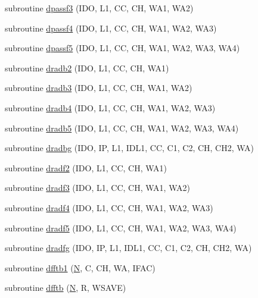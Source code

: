 \begin{DoxyCompactItemize}
\item 
subroutine \hyperlink{dfft_8f_a8eb4ff1245af8c665bfe4f79a98b48f4}{dpassf3} (I\+D\+O, L1, C\+C, C\+H, W\+A1, W\+A2)
\item 
subroutine \hyperlink{dfft_8f_a4e4b63d576099cea5833e5ea8a819320}{dpassf4} (I\+D\+O, L1, C\+C, C\+H, W\+A1, W\+A2, W\+A3)
\item 
subroutine \hyperlink{dfft_8f_ad38e1dce0ae0377ee5627bfec055c7dd}{dpassf5} (I\+D\+O, L1, C\+C, C\+H, W\+A1, W\+A2, W\+A3, W\+A4)
\item 
subroutine \hyperlink{dfft_8f_ae9488397cd0a1572e62d85f9676f8a6a}{dradb2} (I\+D\+O, L1, C\+C, C\+H, W\+A1)
\item 
subroutine \hyperlink{dfft_8f_ab50a0a2352dc26e516a3eb0c6045058f}{dradb3} (I\+D\+O, L1, C\+C, C\+H, W\+A1, W\+A2)
\item 
subroutine \hyperlink{dfft_8f_a24d8fda8b5a1b3ddb6acc4bfaae76137}{dradb4} (I\+D\+O, L1, C\+C, C\+H, W\+A1, W\+A2, W\+A3)
\item 
subroutine \hyperlink{dfft_8f_a358b98c0af4b7568cae55b72f116d9bc}{dradb5} (I\+D\+O, L1, C\+C, C\+H, W\+A1, W\+A2, W\+A3, W\+A4)
\item 
subroutine \hyperlink{dfft_8f_a573359580414f72cea89d58eb1ae71fb}{dradbg} (I\+D\+O, I\+P, L1, I\+D\+L1, C\+C, C1, C2, C\+H, C\+H2, W\+A)
\item 
subroutine \hyperlink{dfft_8f_a5043cd96a2e8b19eeee93d9691e3b07f}{dradf2} (I\+D\+O, L1, C\+C, C\+H, W\+A1)
\item 
subroutine \hyperlink{dfft_8f_a2a474ade71f998d7891d84c48b257a2d}{dradf3} (I\+D\+O, L1, C\+C, C\+H, W\+A1, W\+A2)
\item 
subroutine \hyperlink{dfft_8f_a3996be1cd1ba5f20804caa1804a51d73}{dradf4} (I\+D\+O, L1, C\+C, C\+H, W\+A1, W\+A2, W\+A3)
\item 
subroutine \hyperlink{dfft_8f_a1131b0375ce3d6e3f306d793fd7a63e1}{dradf5} (I\+D\+O, L1, C\+C, C\+H, W\+A1, W\+A2, W\+A3, W\+A4)
\item 
subroutine \hyperlink{dfft_8f_ac8458ce1caf1c2b74a36924895fca904}{dradfg} (I\+D\+O, I\+P, L1, I\+D\+L1, C\+C, C1, C2, C\+H, C\+H2, W\+A)
\item 
subroutine \hyperlink{dfft_8f_ac5843738a94bffc75bc0b5a7ca949494}{dfftb1} (\hyperlink{polmisc_8c_a0240ac851181b84ac374872dc5434ee4}{N}, C, C\+H, W\+A, I\+F\+A\+C)
\item 
subroutine \hyperlink{dfft_8f_a474929892e1520a099a04ff1753cfbd3}{dfftb} (\hyperlink{polmisc_8c_a0240ac851181b84ac374872dc5434ee4}{N}, R, W\+S\+A\+V\+E)
\item 

\end{DoxyCompactItemize}
